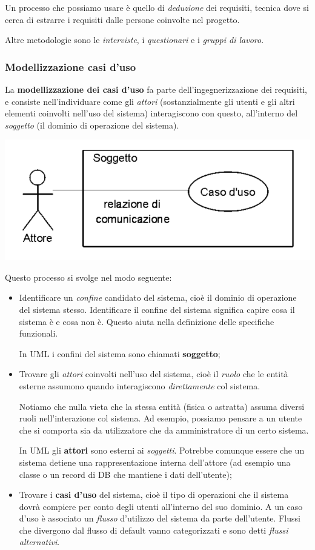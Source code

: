 \documentclass[a4paper,11pt]{article}
\begin{document}
Un processo che possiamo usare è quello di \textit{deduzione} dei requisiti, tecnica dove si cerca di estrarre i requisiti dalle persone coinvolte nel progetto.

Altre metodologie sono le \textit{interviste}, i \textit{questionari} e i \textit{gruppi di lavoro}.

\subsubsection{Modellizzazione casi d'uso}
La \textbf{modellizzazione dei casi d'uso} fa parte dell'ingegnerizzazione dei requisiti, e consiste nell'individuare come gli \textit{attori} (sostanzialmente gli utenti e gli altri elementi coinvolti nell'uso del sistema) interagiscono con questo, all'interno del \textit{soggetto} (il dominio di operazione del sistema). 
\begin{center}
	\includegraphics[scale=0.4]{../figures/casi_uso.png}
\end{center}

Questo processo si svolge nel modo seguente:
\begin{itemize}
	\item Identificare un \textit{confine} candidato del sistema, cioè il dominio di operazione del sistema stesso. Identificare il confine del sistema significa capire cosa il sistema è e cosa non è. Questo aiuta nella definizione delle specifiche funzionali.

		In UML i confini del sistema sono chiamati \textbf{soggetto};
	\item Trovare gli \textit{attori} coinvolti nell'uso del sistema, cioè il \textit{ruolo} che le entità esterne assumono quando interagiscono \textit{direttamente} col sistema. 

		Notiamo che nulla vieta che la stessa entità (fisica o astratta) assuma diversi ruoli nell'interazione col sistema. 
		Ad esempio, possiamo pensare a un utente che si comporta sia da utilizzatore che da amministratore di un certo sistema.

		In UML gli \textbf{attori} sono esterni ai \textit{soggetti}. Potrebbe comunque essere che un sistema detiene una rappresentazione interna dell'attore (ad esempio una classe o un record di DB che mantiene i dati dell'utente);
	\item Trovare i \textbf{casi d'uso} del sistema, cioè il tipo di operazioni che il sistema dovrà compiere per conto degli utenti all'interno del suo dominio. A un caso d'uso è associato un \textit{flusso} d'utilizzo del sistema da parte dell'utente. Flussi che divergono dal flusso di default vanno categorizzati e sono detti \textit{flussi alternativi}.
\end{itemize}
\end{document}
